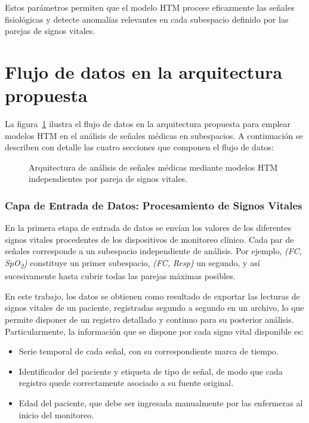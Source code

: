 \medskip

Estos parámetros permiten que el modelo HTM procese eficazmente las señales fisiológicas y detecte anomalías relevantes en cada subespacio definido por las parejas de signos vitales.

\section{Flujo de datos en la arquitectura propuesta}

La figura~\ref{fig:arquitectura_subespacios} ilustra el flujo de datos en la arquitectura propuesta para emplear modelos HTM en el análisis de señales médicas en subespacios. A continuación se describen con detalle las cuatro secciones que componen el flujo de datos:

\begin{figure}[H]
  \centering
  
  \captionsetup{justification=centering}
  \caption{Arquitectura de análisis de señales médicas mediante modelos HTM independientes por pareja de signos vitales.}
  \label{fig:arquitectura_subespacios}
\end{figure}

\subsubsection*{Capa de Entrada de Datos: Procesamiento de Signos Vitales}

En la primera etapa de entrada de datos se envían los valores de los diferentes signos vitales procedentes de los dispositivos de monitoreo clínico. Cada par de señales corresponde a un subespacio independiente de análisis. Por ejemplo, \emph{(FC, SpO\textsubscript{2})} constituye un primer subespacio, \emph{(FC, Resp)} un segundo, y así sucesivamente hasta cubrir todas las parejas máximas posibles.

En este trabajo, los datos se obtienen como resultado de exportar las lecturas de signos vitales de un paciente, registradas segundo a segundo en un archivo, lo que permite disponer de un registro detallado y continuo para su posterior análisis. Particularmente, la información que se dispone por cada signo vital disponible es:

\begin{itemize}
  \item Serie temporal de cada señal, con su correspondiente marca de tiempo.
  \item Identificador del paciente y etiqueta de tipo de señal, de modo que cada registro quede correctamente asociado a su fuente original.
  \item Edad del paciente, que debe ser ingresada manualmente por las enfermeras al inicio del monitoreo.
\end{itemize}


